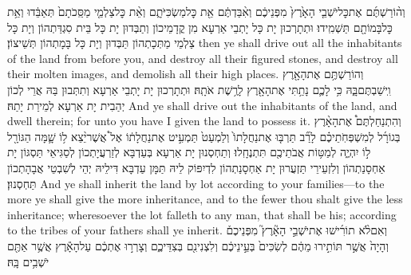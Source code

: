 {וְה֨וֹרַשְׁתֶּ֜ם אֶת\maqqaf כׇּל\maqqaf יֹשְׁבֵ֤י הָאָ֙רֶץ֙ מִפְּנֵיכֶ֔ם וְאִ֨בַּדְתֶּ֔ם אֵ֖ת כׇּל\maqqaf מַשְׂכִּיֹּתָ֑ם וְאֵ֨ת כׇּל\maqqaf צַלְמֵ֤י מַסֵּֽכֹתָם֙ תְּאַבֵּ֔דוּ וְאֵ֥ת כׇּל\maqqaf בָּמוֹתָ֖ם תַּשְׁמִֽידוּ׃}
{וּתְתָרְכוּן יָת כָּל יָתְבֵי אַרְעָא מִן קֳדָמֵיכוֹן וְתַבְּדוּן יָת כָּל בֵּית סִגְדַּתְהוֹן וְיָת כָּל צַלְמֵי מַתְּכָתְהוֹן תַּבְּדוּן וְיָת כָּל בָּמָתְהוֹן תְּשֵׁיצוֹן׃}
{then ye shall drive out all the inhabitants of the land from before you, and destroy all their figured stones, and destroy all their molten images, and demolish all their high places.}{}
{וְהוֹרַשְׁתֶּ֥ם אֶת\maqqaf הָאָ֖רֶץ וִֽישַׁבְתֶּם\maqqaf בָּ֑הּ כִּ֥י לָכֶ֛ם נָתַ֥תִּי אֶת\maqqaf הָאָ֖רֶץ לָרֶ֥שֶׁת אֹתָֽהּ׃}
{וּתְתָרְכוּן יָת יָתְבֵי אַרְעָא וְתִתְּבוּן בַּהּ אֲרֵי לְכוֹן יְהַבִית יָת אַרְעָא לְמֵירַת יָתַהּ׃}
{And ye shall drive out the inhabitants of the land, and dwell therein; for unto you have I given the land to possess it.}{}
{וְהִתְנַחַלְתֶּם֩ אֶת\maqqaf הָאָ֨רֶץ בְּגוֹרָ֜ל לְמִשְׁפְּחֹֽתֵיכֶ֗ם לָרַ֞ב תַּרְבּ֤וּ אֶת\maqqaf נַחֲלָתוֹ֙ וְלַמְעַט֙ תַּמְעִ֣יט אֶת\maqqaf נַחֲלָת֔וֹ אֶל֩ אֲשֶׁר\maqqaf יֵ֨צֵא ל֥וֹ שָׁ֛מָּה הַגּוֹרָ֖ל ל֣וֹ יִהְיֶ֑ה לְמַטּ֥וֹת אֲבֹתֵיכֶ֖ם תִּתְנֶחָֽלוּ׃}
{וְתַחְסְנוּן יָת אַרְעָא בְּעַדְבָּא לְזַרְעֲיָתְכוֹן לְסַגִּיאֵי תַּסְגּוֹן יָת אַחְסָנַתְהוֹן וְלִזְעֵירֵי תַּזְעֲרוּן יָת אַחְסָנַתְהוֹן לִדְיִפּוֹק לֵיהּ תַּמָּן עַדְבָּא דִּילֵיהּ יְהֵי לְשִׁבְטֵי אֲבָהָתְכוֹן תַּחְסְנוּן׃}
{And ye shall inherit the land by lot according to your families—to the more ye shall give the more inheritance, and to the fewer thou shalt give the less inheritance; wheresoever the lot falleth to any man, that shall be his; according to the tribes of your fathers shall ye inherit.}{}
{וְאִם\maqqaf לֹ֨א תוֹרִ֜ישׁוּ אֶת\maqqaf יֹשְׁבֵ֣י הָאָ֘רֶץ֮ מִפְּנֵיכֶם֒ וְהָיָה֙ אֲשֶׁ֣ר תּוֹתִ֣ירוּ מֵהֶ֔ם לְשִׂכִּים֙ בְּעֵ֣ינֵיכֶ֔ם וְלִצְנִינִ֖ם בְּצִדֵּיכֶ֑ם וְצָרְר֣וּ אֶתְכֶ֔ם עַל\maqqaf הָאָ֕רֶץ אֲשֶׁ֥ר אַתֶּ֖ם יֹשְׁבִ֥ים בָּֽהּ׃}
